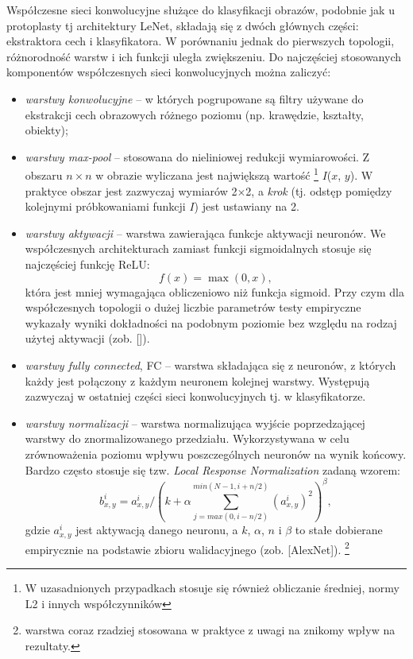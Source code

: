 Współczesne sieci konwolucyjne służące do klasyfikacji obrazów, podobnie jak u protoplasty tj architektury LeNet, składają się z dwóch głównych części: ekstraktora cech i klasyfikatora. W porównaniu jednak do pierwszych topologii, różnorodność warstw i ich funkcji uległa zwiększeniu. Do najczęściej stosowanych komponentów współczesnych sieci konwolucyjnych można zaliczyć:
\begin{itemize}
	\item \textit{warstwy konwolucyjne} -- w których pogrupowane są filtry używane do ekstrakcji cech obrazowych różnego poziomu (np. krawędzie, kształty, obiekty);
	\item \textit{warstwy max-pool} -- stosowana do nieliniowej redukcji wymiarowości. Z obszaru $n\times$$n$ w obrazie wyliczana jest największą wartość \footnote{W uzasadnionych przypadkach stosuje się również obliczanie średniej, normy L2 i innych współczynników} $I$($x$, $y$). W praktyce obszar jest zazwyczaj wymiarów 2$\times$2, a \textit{krok} (tj. odstęp pomiędzy kolejnymi próbkowaniami funkcji $I$) jest ustawiany na 2.
	\item \textit{warstwy aktywacji} -- warstwa zawierająca funkcje aktywacji neuronów. We współczesnych architekturach zamiast funkcji sigmoidalnych stosuje się najczęściej funkcję ReLU:
	\begin{equation}
		f(x) = \max(0, x),
	\end{equation}
	która jest mniej wymagająca obliczeniowo niż funkcja sigmoid. Przy czym dla współczesnych topologii o dużej liczbie parametrów testy empiryczne wykazały wyniki dokładności na podobnym poziomie bez względu na rodzaj użytej aktywacji (zob. []). 
	\item \textit{warstwy fully connected}, FC -- warstwa składająca się z neuronów, z których każdy jest połączony z każdym neuronem kolejnej warstwy. Występują zazwyczaj w ostatniej części sieci konwolucyjnych tj. w klasyfikatorze.
	\item \textit{warstwy normalizacji} -- warstwa normalizująca wyjście poprzedzającej warstwy do znormalizowanego przedziału. Wykorzystywana w celu zrównoważenia poziomu wpływu poszczególnych neuronów na wynik końcowy. Bardzo często stosuje się tzw. \textit{Local Response Normalization} zadaną wzorem:
	\begin{equation}
	\label{DLnormEquation}
	b_{x,y}^{i} = a_{x,y}^{i}/\left ( k + \alpha \sum_{j=max(0,i-n/2)}^{min(N-1,i+n/2)}(a_{x,y}^{i})^2 \right )^\beta,
	\end{equation}
	gdzie $a_{x,y}^{i}$ jest aktywacją danego neuronu, a $k$, $\alpha$, $n$ i $\beta$ to stałe dobierane empirycznie na podstawie zbioru walidacyjnego (zob. [AlexNet]).
	\footnote{warstwa coraz rzadziej stosowana w praktyce z uwagi na znikomy wpływ na rezultaty.}
\end{itemize}

